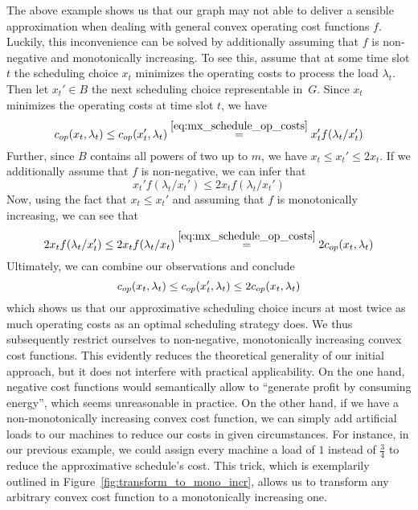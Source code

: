 The above example shows us that our graph may not able to deliver a sensible approximation when dealing with general convex operating cost functions $f$. Luckily, this inconvenience can be solved by additionally assuming that $f$ is non-negative and monotonically increasing. To see this, assume that at some time slot $t$ the scheduling choice $x_t$ minimizes the operating costs to process the load $\lambda_t$. Then let $x_t'\in B$ the next scheduling choice representable in~$G$. Since $x_t$ minimizes the operating costs at time slot $t$, we have
\begin{equation*}
	c_{op}(x_t,\lambda_t)\le c_{op}(x_t',\lambda_t)\stackrel{\eqref{eq:mx_schedule_op_costs}}{=}x_t'f(\lambda_t/x_t')
\end{equation*}
Further, since $B$ contains all powers of two up to $m$, we have $x_t\le x_t'\le 2x_t$. If we additionally assume that $f$ is non-negative, we can infer that
\begin{equation*}
	x_t'f(\lambda_t/x_t')\le2x_tf(\lambda_t/x_t')
\end{equation*}
Now, using the fact that $x_t\le x_t'$ and assuming that $f$ is monotonically increasing, we can see that
\begin{equation*}
	2x_tf(\lambda_t/x_t')\le 2x_tf(\lambda_t/x_t)\stackrel{\eqref{eq:mx_schedule_op_costs}}{=}2c_{op}(x_t,\lambda_t)
\end{equation*}
Ultimately, we can combine our observations and conclude
\begin{equation*}
	c_{op}(x_t,\lambda_t)\le c_{op}(x_t',\lambda_t)\le2c_{op}(x_t,\lambda_t)
\end{equation*}
which shows us that our approximative scheduling choice incurs at most twice as much operating costs as an optimal scheduling strategy does. We thus subsequently restrict ourselves to non-negative, monotonically increasing convex cost functions. This evidently reduces the theoretical generality of our initial approach, but it does not interfere with practical applicability. On the one hand, negative cost functions would semantically allow to ``generate profit by consuming energy'', which seems unreasonable in practice. On the other hand, if we have a non-monotonically increasing convex cost function, we can simply add artificial loads to our machines to reduce our costs in given circumstances. For instance, in our previous example, we could assign every machine a load of $1$ instead of $\frac{3}{4}$ to reduce the approximative schedule's cost. This trick, which is exemplarily outlined in Figure~\ref{fig:transform_to_mono_incr}, allows us to transform any arbitrary convex cost function to a monotonically increasing one.
